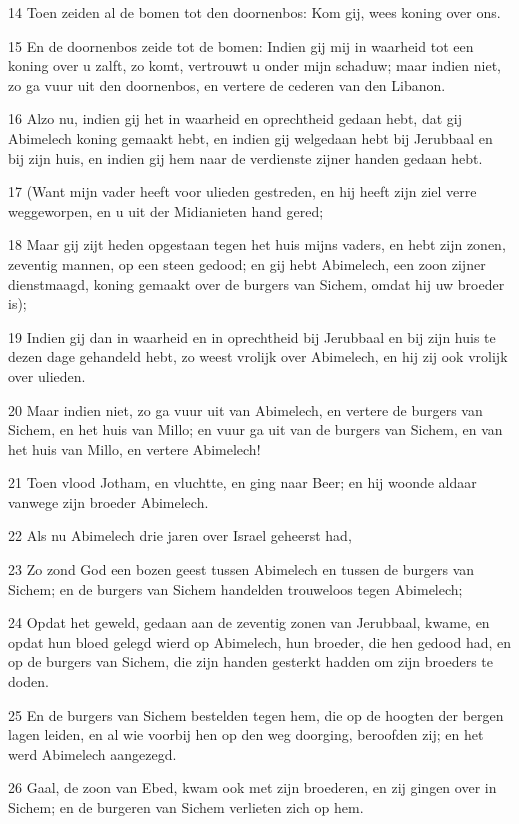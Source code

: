\par 14 Toen zeiden al de bomen tot den doornenbos: Kom gij, wees koning over ons.
\par 15 En de doornenbos zeide tot de bomen: Indien gij mij in waarheid tot een koning over u zalft, zo komt, vertrouwt u onder mijn schaduw; maar indien niet, zo ga vuur uit den doornenbos, en vertere de cederen van den Libanon.
\par 16 Alzo nu, indien gij het in waarheid en oprechtheid gedaan hebt, dat gij Abimelech koning gemaakt hebt, en indien gij welgedaan hebt bij Jerubbaal en bij zijn huis, en indien gij hem naar de verdienste zijner handen gedaan hebt.
\par 17 (Want mijn vader heeft voor ulieden gestreden, en hij heeft zijn ziel verre weggeworpen, en u uit der Midianieten hand gered;
\par 18 Maar gij zijt heden opgestaan tegen het huis mijns vaders, en hebt zijn zonen, zeventig mannen, op een steen gedood; en gij hebt Abimelech, een zoon zijner dienstmaagd, koning gemaakt over de burgers van Sichem, omdat hij uw broeder is);
\par 19 Indien gij dan in waarheid en in oprechtheid bij Jerubbaal en bij zijn huis te dezen dage gehandeld hebt, zo weest vrolijk over Abimelech, en hij zij ook vrolijk over ulieden.
\par 20 Maar indien niet, zo ga vuur uit van Abimelech, en vertere de burgers van Sichem, en het huis van Millo; en vuur ga uit van de burgers van Sichem, en van het huis van Millo, en vertere Abimelech!
\par 21 Toen vlood Jotham, en vluchtte, en ging naar Beer; en hij woonde aldaar vanwege zijn broeder Abimelech.
\par 22 Als nu Abimelech drie jaren over Israel geheerst had,
\par 23 Zo zond God een bozen geest tussen Abimelech en tussen de burgers van Sichem; en de burgers van Sichem handelden trouweloos tegen Abimelech;
\par 24 Opdat het geweld, gedaan aan de zeventig zonen van Jerubbaal, kwame, en opdat hun bloed gelegd wierd op Abimelech, hun broeder, die hen gedood had, en op de burgers van Sichem, die zijn handen gesterkt hadden om zijn broeders te doden.
\par 25 En de burgers van Sichem bestelden tegen hem, die op de hoogten der bergen lagen leiden, en al wie voorbij hen op den weg doorging, beroofden zij; en het werd Abimelech aangezegd.
\par 26 Gaal, de zoon van Ebed, kwam ook met zijn broederen, en zij gingen over in Sichem; en de burgeren van Sichem verlieten zich op hem.

